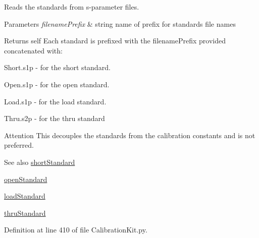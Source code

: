 Reads the standards from s-\/parameter files. 


\begin{DoxyParams}{Parameters}
{\em filename\+Prefix} & string name of prefix for standards file names \\
\hline
\end{DoxyParams}
\begin{DoxyReturn}{Returns}
self Each standard is prefixed with the filename\+Prefix provided concatenated with\+:
\begin{DoxyItemize}
\item \textquotesingle{}Short.\+s1p\textquotesingle{} -\/ for the short standard.
\item \textquotesingle{}Open.\+s1p\textquotesingle{} -\/ for the open standard.
\item \textquotesingle{}Load.\+s1p\textquotesingle{} -\/ for the load standard.
\item \textquotesingle{}Thru.\+s2p\textquotesingle{} -\/ for the thru standard 
\end{DoxyItemize}
\end{DoxyReturn}
\begin{DoxyAttention}{Attention}
This decouples the standards from the calibration constants and is not preferred. 
\end{DoxyAttention}
\begin{DoxySeeAlso}{See also}
\hyperlink{classSignalIntegrity_1_1Measurement_1_1CalKit_1_1CalibrationKit_1_1CalibrationKit_a094c01f8f3b9b22b8759481b3d5bdb85}{short\+Standard} 

\hyperlink{classSignalIntegrity_1_1Measurement_1_1CalKit_1_1CalibrationKit_1_1CalibrationKit_adfa88578140d393e4fc3d5e6976c4586}{open\+Standard} 

\hyperlink{classSignalIntegrity_1_1Measurement_1_1CalKit_1_1CalibrationKit_1_1CalibrationKit_af4b585ef48fed700d70b2bee7e5ffdbe}{load\+Standard} 

\hyperlink{classSignalIntegrity_1_1Measurement_1_1CalKit_1_1CalibrationKit_1_1CalibrationKit_a63691e31dc0a91dbcfe40635f9c87599}{thru\+Standard} 
\end{DoxySeeAlso}


Definition at line 410 of file Calibration\+Kit.\+py.

\mbox{\label{classSignalIntegrity_1_1Measurement_1_1CalKit_1_1CalibrationKit_1_1CalibrationKit_ab30dce63eb90ca31d9bea9036710996a}} 
